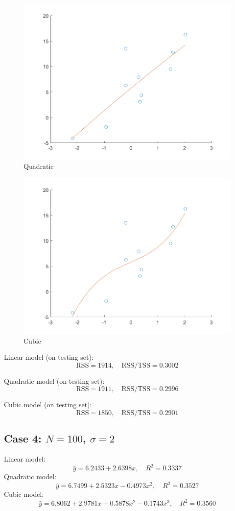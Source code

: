 \documentclass{article}
\begin{document}
{{        \begin{figure}[H]
            \centering
            \includegraphics[width = 0.6\linewidth]{2-2-quadratic-10-2.0.png}
            \caption{Quadratic}
        \end{figure}

        \begin{figure}[H]
            \centering
            \includegraphics[width = 0.6\linewidth]{2-2-cubic-10-2.0.png}
            \caption{Cubic}     
        \end{figure}

        Linear model (on testing set): $$\mathrm{RSS} = 1914, \quad \mathrm{RSS}/\mathrm{TSS} = 0.3002$$

        Quadratic model (on testing set): $$\mathrm{RSS} = 1911, \quad \mathrm{RSS}/\mathrm{TSS} = 0.2996$$

        Cubic model (on testing set): $$\mathrm{RSS} = 1850, \quad \mathrm{RSS}/\mathrm{TSS} = 0.2901$$
    }

    \subsection*{Case 4: $N=100$, $\sigma = 2$}
    {
        Linear model: $$\hat{y} = 6.2433 + 2.6398x ,\quad R^2 = 0.3337$$
        Quadratic model: $$\hat{y} = 6.7499 + 2.5323x - 0.4973x^2 ,\quad R^2 = 0.3527$$
        Cubic model: $$\hat{y} = 6.8062 + 2.9781x - 0.5878x^2 - 0.1743x^3 ,\quad R^2 = 0.3560$$

}}
\end{document}
